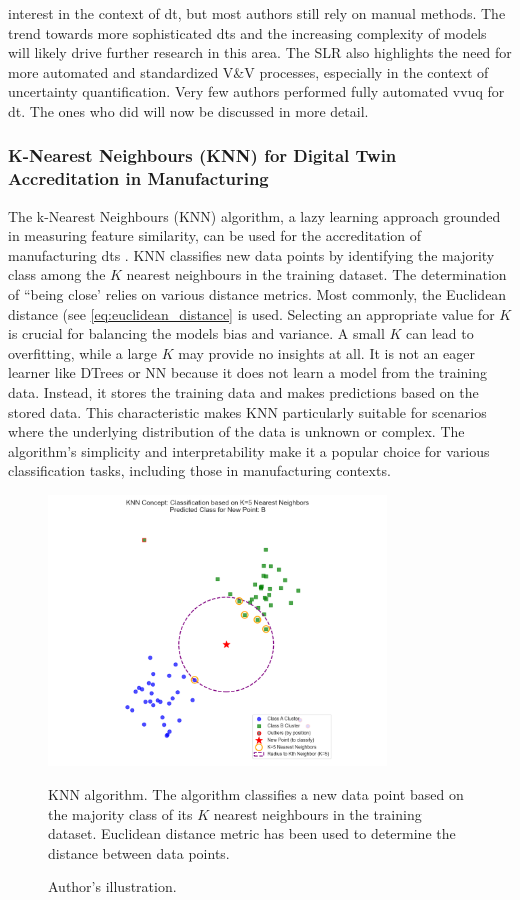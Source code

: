 interest in the context of \gls{dt}, but most authors still rely on manual methods. The trend towards more sophisticated \gls{dt}s and the increasing complexity of models will likely drive further research in this area. The SLR also highlights the need for more automated and standardized V\&V processes, especially in the context of uncertainty quantification. Very few authors performed fully automated \gls{vvuq} for \gls{dt}. The ones who did will now be discussed in more detail.


\subsubsection*{K-Nearest Neighbours (KNN) for Digital Twin Accreditation in Manufacturing}
\label{sec:knn}

The k-Nearest Neighbours (KNN) algorithm, a lazy learning approach grounded in measuring feature similarity, can be used for the accreditation of manufacturing \gls{dt}s \autocite{dos2024simulation}. KNN classifies new data points by identifying the majority class among the $K$ nearest neighbours in the training dataset. The determination of ``being close' relies on various distance metrics. Most commonly, the Euclidean distance (see \autoref{eq:euclidean_distance} is used. Selecting an appropriate value for $K$ is crucial for balancing the models bias and variance. A small $K$ can lead to overfitting, while a large $K$ may provide no insights at all. It is not an eager learner like DTrees or NN because it does not learn a model from the training data. Instead, it stores the training data and makes predictions based on the stored data. This characteristic makes KNN particularly suitable for scenarios where the underlying distribution of the data is unknown or complex. The algorithm's simplicity and interpretability make it a popular choice for various classification tasks, including those in manufacturing contexts.

\begin{figure}[htbp]
    \centering
    \includegraphics[width=0.8\textwidth]{figures/knn.png}
    \caption[KNN Intuition]{KNN algorithm. The algorithm classifies a new data point based on the majority class of its $K$ nearest neighbours in the training dataset. Euclidean distance metric has been used to determine the distance between data points.}
    \label{fig:knn}
    \caption*{Author's illustration.}
\end{figure}


